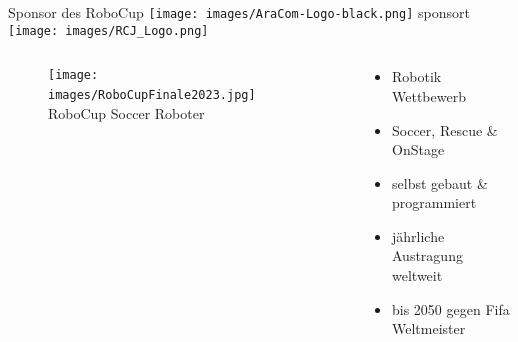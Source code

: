 \documentclass[aspectratio=169]{beamer}
\begin{document}
\begin{frame}{Sponsor des RoboCup}
  \texttt{[image: images/AraCom-Logo-black.png]} sponsort
  \texttt{[image: images/RCJ\_Logo.png]}
  \begin{columns}
    \begin{column}{0.45\textwidth}
      \begin{figure}[h]
        \centering
        \texttt{[image: images/RoboCupFinale2023.jpg]}
        ~ \cite{robocup} RoboCup Soccer Roboter
      \end{figure}
    \end{column}
    \begin{column}{0.45\textwidth}
      \begin{itemize}
        \item Robotik Wettbewerb
        \item Soccer, Rescue \& OnStage
        \item selbst gebaut \& programmiert
        \item jährliche Austragung weltweit
        \item bis 2050 gegen Fifa Weltmeister
      \end{itemize}
    \end{column}
  \end{columns}
\end{frame}
\end{document}
